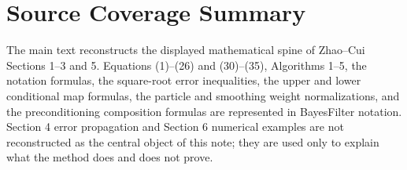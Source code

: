 \documentclass[11pt]{article}
\begin{document}
\appendix
\section{Source Coverage Summary}

The main text reconstructs the displayed mathematical spine of Zhao--Cui
Sections 1--3 and 5.  Equations (1)--(26) and (30)--(35), Algorithms 1--5,
the notation formulas, the square-root error inequalities, the upper and lower
conditional map formulas, the particle and smoothing weight normalizations, and
the preconditioning composition formulas are represented in BayesFilter
notation.  Section 4 error propagation and Section 6 numerical examples are
not reconstructed as the central object of this note; they are used only to
explain what the method does and does not prove.
\end{document}
